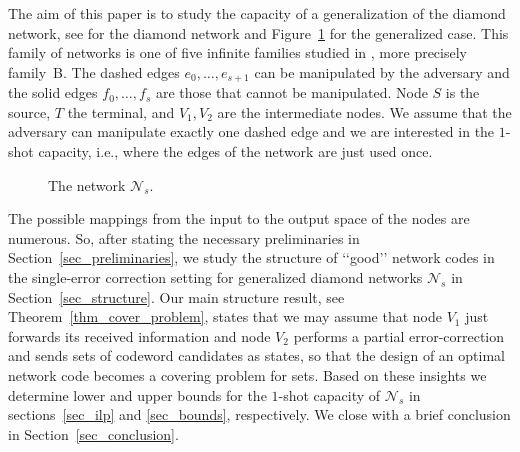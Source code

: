 \documentclass[11pt]{article}
\newcommand{\cN}{\mathcal{N}}
\begin{document}
The aim of this paper is to study the capacity of a generalization of the diamond network, see \cite{beemer2022network,beemer2021curious} for the 
diamond network and Figure~\ref{fig_generalized_diamond_network} for the generalized case. This family of networks is one of five infinite 
families studied in \cite{beemer2022network_arxiv}, more precisely family~B. The dashed edges $e_0,\dots,e_{s+1}$ can be manipulated by 
the adversary and the solid edges $f_0,\dots,f_s$ are those that cannot be manipulated. Node $S$ is the source, $T$ the terminal, and $V_1,V_2$ 
are the intermediate nodes. We assume that the adversary can manipulate exactly one dashed edge and we are interested in the $1$-shot capacity, i.e., 
where the edges of the network are just used once. 

\begin{figure}
\begin{center}
  \caption{The network $\cN_s$.}
  \label{fig_generalized_diamond_network}
\end{center}
\end{figure}

The possible mappings from the input to the output space of the nodes are numerous. So, after stating the 
necessary preliminaries in Section~\ref{sec_preliminaries}, we study the structure of {\lq\lq}good{\rq\rq} 
network codes in the single-error correction setting for generalized diamond networks $\cN_s$ in 
Section~\ref{sec_structure}. Our main structure result, see Theorem~\ref{thm_cover_problem}, states that we 
may assume that node $V_1$ just forwards its received information and node $V_2$ performs a partial error-correction 
and sends sets of codeword candidates as states, so that the design of an optimal network code becomes a covering problem 
for sets.  Based on these insights we determine lower and upper bounds for the $1$-shot 
capacity of $\cN_s$ in sections~\ref{sec_ilp} and \ref{sec_bounds}, respectively.  
We close with a brief conclusion in Section~\ref{sec_conclusion}. 
\end{document}
